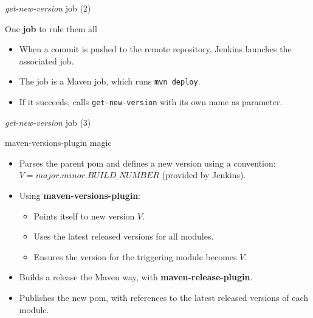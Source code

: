 \documentclass[presentation]{beamer}
\begin{document}
{
\begin{frame}[label=sec-6-4]{\textit{get-new-version} job (2)}

\begin{block}{One \textbf{job} to rule them all}

\begin{itemize}
\item When a commit is pushed to the remote repository, Jenkins launches the associated job.
\item The job is a Maven job, which runs \texttt{mvn deploy}.
\item If it succeeds, calls \texttt{get-new-version} with its own name as parameter.
\end{itemize}
\end{block}
\end{frame}
} %

{
\begin{frame}[label=sec-6-5]{\textit{get-new-version} job (3)}

\begin{block}{maven-versions-plugin magic}

\begin{itemize}
\item Parses the parent pom and defines a new version using a convention: $V = major.minor.BUILD\_NUMBER$ (provided by Jenkins).
\item Using \textbf{maven-versions-plugin}:
\begin{itemize}
\item Points itself to new version $V$.
\item Uses the latest released versions for all modules.
\item Ensures the version for the triggering module becomes $V$.
\end{itemize}
\item Builds a release the Maven way, with \textbf{maven-release-plugin}.
\item Publishes the new pom, with references to the latest released versions of each module.
\end{itemize}
\end{block}
\end{frame}
} %
\end{document}
